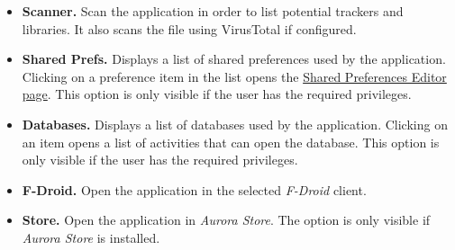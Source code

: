 \begin{itemize}
    \item \textbf{Scanner.} Scan the application in order to list potential trackers and libraries.
    It also scans the file using VirusTotal if configured.\\

    \item \textbf{Shared Prefs.} Displays a list of shared preferences used by the application.
    Clicking on a preference item in the list opens the \hyperref[sec:shared-preferences-editor-page]{Shared Preferences
    Editor page}. This option is only visible if the user has the required privileges.

    \item \textbf{Databases.} Displays a list of databases used by the application. Clicking on an
    item opens a list of activities that can open the database. This option is only visible if the
    user has the required privileges.

    \item \textbf{F-Droid.} Open the application in the selected \textit{F-Droid} client.

    \item \textbf{Store.} Open the application in \textit{Aurora Store}. The option is only visible if \textit{Aurora
    Store} is installed.
\end{itemize}

